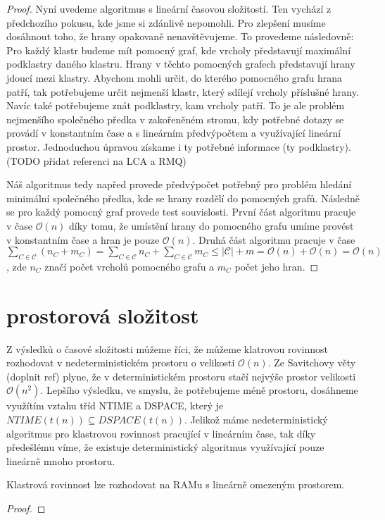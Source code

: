 \begin{proof}
Nyní uvedeme algoritmus s lineární časovou složitostí. Ten vychází z předchozího pokusu, kde jsme si zdánlivě nepomohli. Pro zlepšení musíme dosáhnout toho, že hrany opakovaně nenavštěvujeme. To provedeme následovně: Pro každý klastr budeme mít pomocný graf, kde vrcholy představují maximální podklastry daného klastru. Hrany v těchto pomocných grafech představují hrany jdoucí mezi klastry. Abychom mohli určit, do kterého pomocného grafu hrana patří, tak potřebujeme určit nejmenší klastr, který sdílejí vrcholy příslušné hrany. Navíc také potřebujeme znát podklastry, kam vrcholy patří. To je ale problém nejmenšího společného předka v zakořeněném stromu, kdy potřebné dotazy se provádí v konstantním čase a s lineárním předvýpočtem a využívající lineární prostor. Jednoduchou úpravou získame i ty potřebné informace (ty podklastry). (TODO přidat referenci na LCA a RMQ)

Náš algoritmus tedy napřed provede předvýpočet potřebný pro problém hledání minimální společného předka, kde se hrany rozdělí do pomocných grafů. Následně se pro každý pomocný graf provede test souvislosti. První část algoritmu pracuje v čase $\mathcal{O}(n)$ díky tomu, že umístění hrany do pomocného grafu umíme provést v konstantním čase a hran je pouze $\mathcal{O}(n)$. Druhá část algoritmu pracuje v čase $\sum\limits_{C \in \mathcal C}(n_C+m_C) = \sum\limits_{C \in \mathcal C}n_C + \sum\limits_{C \in \mathcal C}m_C \leq |\mathcal C| + m = \mathcal O(n) + \mathcal O(n)=\mathcal O(n)$, zde $n_C$ značí počet vrcholů pomocného grafu a $m_C$ počet jeho hran.
\end{proof}

\section{prostorová složitost}
Z výsledků o časové složitosti můžeme říci, že můžeme klatrovou rovinnost rozhodovat v nedeterministickém prostoru o velikosti $\mathcal{O}(n)$. Ze Savitchovy věty (doplnit ref) plyne, že v deterministickém prostoru stačí nejvýše prostor velikosti $\mathcal{O}(n^2)$.
Lepšího výsledku, ve smyslu, že potřebujeme méně prostoru, dosáhneme využítím vztahu tříd NTIME a DSPACE, který je $NTIME(t(n)) \subseteq DSPACE(t(n))$. Jelikož máme nedeterministický algoritmus pro klastrovou rovinnost pracující v lineárním čase, tak díky předešlému víme, že existuje deterministický algoritmus využívající pouze lineárně mnoho prostoru.
\begin{tvr}
Klastrová rovinnost lze rozhodovat na RAMu s lineárně omezeným prostorem.
\end{tvr}
\begin{proof}
\end{proof}